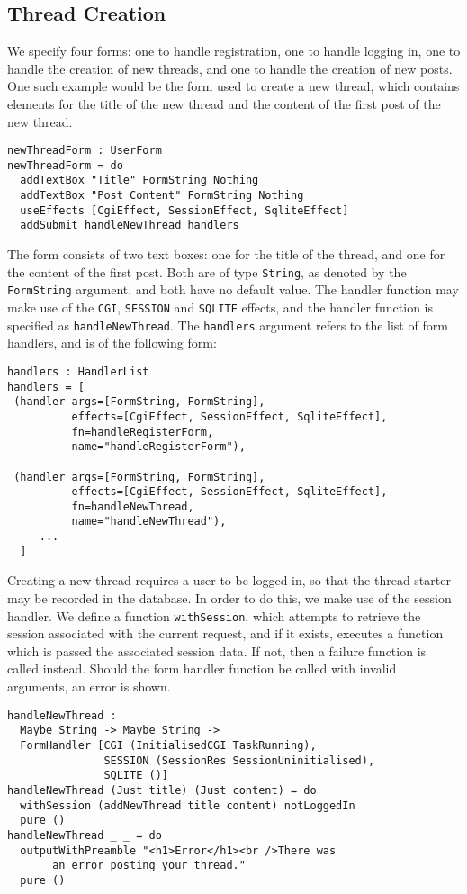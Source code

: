 \documentclass[preprint]{sigplanconf}
\begin{document}
\subsection{Thread Creation}
We specify four forms: one to handle registration, one to handle logging in, one to handle the creation of new threads, and one to handle the creation of new posts. One such example would be the form used to create a new thread, which contains elements for the title of the new thread and the content of the first post of the new thread.
\begin{Verbatim}
newThreadForm : UserForm
newThreadForm = do
  addTextBox "Title" FormString Nothing
  addTextBox "Post Content" FormString Nothing 
  useEffects [CgiEffect, SessionEffect, SqliteEffect]
  addSubmit handleNewThread handlers
\end{Verbatim}
The form consists of two text boxes: one for the title of the thread, and one for the content of the first post. Both are of type \texttt{String}, as denoted by the \texttt{FormString} argument, and both have no default value. The handler function may make use of the \texttt{CGI}, \texttt{SESSION} and \texttt{SQLITE} effects, and the handler function is specified as \texttt{handleNewThread}. The \texttt{handlers} argument refers to the list of form handlers, and is of the following form:
\begin{Verbatim}
handlers : HandlerList
handlers = [
 (handler args=[FormString, FormString], 
          effects=[CgiEffect, SessionEffect, SqliteEffect], 
          fn=handleRegisterForm, 
          name="handleRegisterForm"),
  
 (handler args=[FormString, FormString], 
          effects=[CgiEffect, SessionEffect, SqliteEffect], 
          fn=handleNewThread, 
          name="handleNewThread"),
     ...
  ]
\end{Verbatim}
Creating a new thread requires a user to be logged in, so that the thread starter may be recorded in the database. In order to do this, we make use of the session handler. We define a function \texttt{withSession}, which attempts to retrieve the session associated with the current request, and if it exists, executes a function which is passed the associated session data. If not, then a failure function is called instead. Should the form handler function be called with invalid arguments, an error is shown.
\begin{Verbatim}
handleNewThread : 
  Maybe String -> Maybe String -> 
  FormHandler [CGI (InitialisedCGI TaskRunning), 
               SESSION (SessionRes SessionUninitialised), 
               SQLITE ()]  
handleNewThread (Just title) (Just content) = do 
  withSession (addNewThread title content) notLoggedIn
  pure ()
handleNewThread _ _ = do 
  outputWithPreamble "<h1>Error</h1><br />There was 
       an error posting your thread."
  pure ()
\end{Verbatim}
\end{document}
